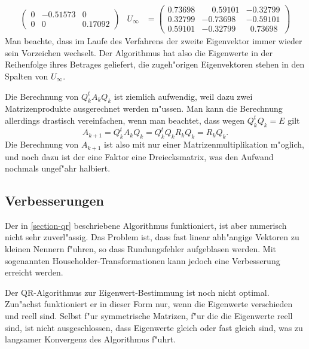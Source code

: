 \begin{beispiel}
\begin{align*}
\begin{pmatrix}
   0& -0.51573&0\\
   0& 0&  0.17092
\end{pmatrix}&
U_\infty&=\begin{pmatrix}
   0.73698& \phantom{-}0.59101& -0.32799\\
   0.32799& -0.73698& -0.59101\\
   0.59101& -0.32799& \phantom{0}0.73698
\end{pmatrix}
\end{align*}
Man beachte, dass im Laufe des Verfahrens der zweite Eigenvektor
immer wieder sein Vorzeichen wechselt.
Der Algorithmus hat also die Eigenwerte in der Reihenfolge
ihres Betrages geliefert, die zugeh"origen Eigenvektoren
stehen in den Spalten von $U_\infty$.
\end{beispiel}

Die Berechnung von $Q_k^tA_kQ_k$ ist ziemlich aufwendig, weil dazu
zwei Matrizenprodukte ausgerechnet werden m"ussen.
Man kann die
Berechnung allerdings drastisch vereinfachen, wenn man beachtet,
dass wegen $Q_k^tQ_k=E$ gilt
\[
A_{k+1}=Q_k^tA_kQ_k=Q_k^tQ_kR_kQ_k=R_kQ_k.
\]
Die Berechnung von $A_{k+1}$ ist also mit nur einer Matrizenmultiplikation
m"oglich, und noch dazu ist der eine Faktor eine Dreiecksmatrix, was den
Aufwand nochmals ungef"ahr halbiert.

\subsection{Verbesserungen}
Der in \ref{section-qr} beschriebene Algorithmus funktioniert, ist
aber numerisch nicht sehr zuverl"assig.
Das Problem ist, dass fast
linear abh"angige Vektoren zu kleinen Nennern f"uhren, so dass
Rundungsfehler aufgeblasen werden.
Mit sogenannten Householder-Transformationen kann jedoch eine 
Verbesserung erreicht werden.

Der QR-Algorithmus zur Eigenwert-Bestimmung ist noch nicht optimal.
Zun"achst funktioniert er in dieser Form nur, wenn die Eigenwerte
verschieden und reell sind.
Selbst f"ur symmetrische Matrizen,
f"ur die die Eigenwerte reell sind, ist nicht ausgeschlossen, dass
Eigenwerte gleich oder fast gleich sind, was zu langsamer
Konvergenz des Algorithmus f"uhrt.

